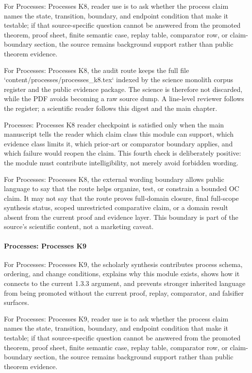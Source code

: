 For Processes: Processes K8, reader use is to ask whether the process claim names the state, transition, boundary, and endpoint condition that make it testable; if that source-specific question cannot be answered from the promoted theorem, proof sheet, finite semantic case, replay table, comparator row, or claim-boundary section, the source remains background support rather than public theorem evidence.


For Processes: Processes K8, the audit route keeps the full file `content/processes/processes\_k8.tex` indexed by the science monolith corpus register and the public evidence package. The science is therefore not discarded, while the PDF avoids becoming a raw source dump. A line-level reviewer follows the register; a scientific reader follows this digest and the main chapter.


Processes: Processes K8 reader checkpoint is satisfied only when the main manuscript tells the reader which claim class this module can support, which evidence class limits it, which prior-art or comparator boundary applies, and which failure would reopen the claim. This fourth check is deliberately positive: the module must contribute intelligibility, not merely avoid forbidden wording.


For Processes: Processes K8, the external wording boundary allows public language to say that the route helps organize, test, or constrain a bounded OC claim. It may not say that the route proves full-domain closure, final full-scope synthesis status, scoped unrestricted comparative claim, or a domain result absent from the current proof and evidence layer. This boundary is part of the source's scientific content, not a marketing caveat.


\paragraph{Processes: Processes K9}

For Processes: Processes K9, the scholarly synthesis contributes process schema, ordering, and change conditions, explains why this module exists, shows how it connects to the current 1.3.3 argument, and prevents stronger inherited language from being promoted without the current proof, replay, comparator, and falsifier surfaces.


For Processes: Processes K9, reader use is to ask whether the process claim names the state, transition, boundary, and endpoint condition that make it testable; if that source-specific question cannot be answered from the promoted theorem, proof sheet, finite semantic case, replay table, comparator row, or claim-boundary section, the source remains background support rather than public theorem evidence.


